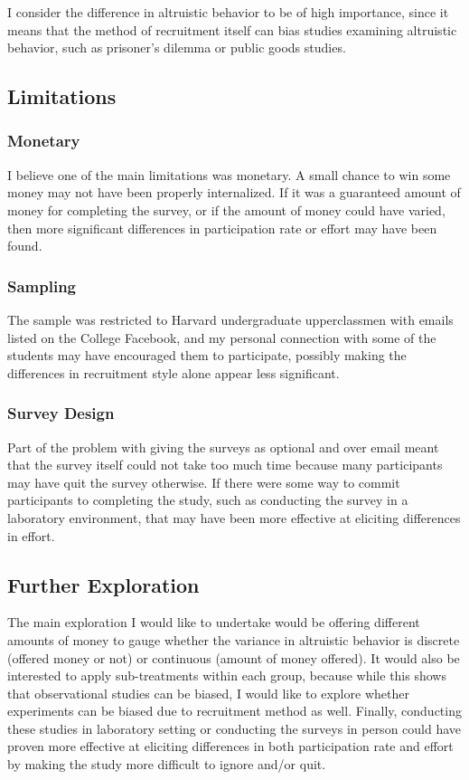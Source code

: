 \documentclass[12pt]{article}
\begin{document}
I consider the difference in altruistic behavior to be of high importance, since it means that the method of recruitment itself can bias studies examining altruistic behavior, such as prisoner's dilemma or public goods studies. 

\subsection{Limitations}
\subsubsection{Monetary}
I believe one of the main limitations was monetary. A small chance to win some money may not have been properly internalized. If it was a guaranteed amount of money for completing the survey, or if the amount of money could have varied, then more significant differences in participation rate or effort may have been found. 

\subsubsection{Sampling}
The sample was restricted to Harvard undergraduate upperclassmen with emails listed on the College Facebook, and my personal connection with some of the students may have encouraged them to participate, possibly making the differences in recruitment style alone appear less significant. 

\subsubsection{Survey Design}
Part of the problem with giving the surveys as optional and over email meant that the survey itself could not take too much time because many participants may have quit the survey otherwise. If there were some way to commit participants to completing the study, such as conducting the survey in a laboratory environment, that may have been more effective at eliciting differences in effort. 

\subsection{Further Exploration}
The main exploration I would like to undertake would be offering different amounts of money to gauge whether the variance in altruistic behavior is discrete (offered money or not) or continuous (amount of money offered). It would also be interested to apply sub-treatments within each group, because while this shows that observational studies can be biased, I would like to explore whether experiments can be biased due to recruitment method as well. Finally, conducting these studies in laboratory setting or conducting the surveys in person could have proven more effective at eliciting differences in both participation rate and effort by making the study more difficult to ignore and/or quit.

\medskip

\end{document}
